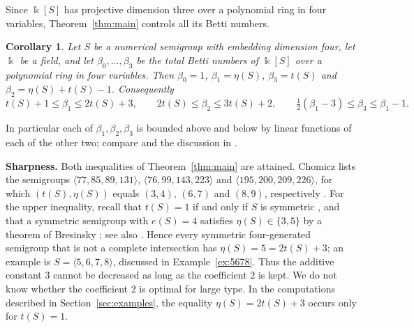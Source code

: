 \documentclass{amsart}
\newtheorem{corollary}[theorem]{Corollary}
\theoremstyle{definition}
\theoremstyle{remark}
\numberwithin{equation}{section}
\newcommand{\kk}{\Bbbk}
\begin{document}
Since $\kk[S]$ has projective dimension three over a polynomial ring in four variables, Theorem~\ref{thm:main} controls all its Betti numbers.

\begin{corollary}\label{cor:betti}
Let $S$ be a numerical semigroup with embedding dimension four, let $\kk$ be a field, and let $\beta_0,\dots,\beta_3$ be the total Betti numbers of $\kk[S]$ over a polynomial ring in four variables. Then $\beta_0=1$, $\beta_1=\eta(S)$, $\beta_3=t(S)$ and $\beta_2=\eta(S)+t(S)-1$. Consequently
\[
t(S)+1\le\beta_1\le 2t(S)+3,\qquad 2t(S)\le\beta_2\le 3t(S)+2,\qquad \tfrac12(\beta_1-3)\le\beta_3\le\beta_1-1 .
\]
\end{corollary}

In particular each of $\beta_1,\beta_2,\beta_3$ is bounded above and below by linear functions of each of the other two; compare \cite[Problem~24]{MS25} and the discussion in \cite[Section~1]{Cho26}.

\medskip\noindent\textbf{Sharpness.} Both inequalities of Theorem~\ref{thm:main} are attained. Chomicz lists the semigroups $\langle 77,85,89,131\rangle$, $\langle 76,99,143,223\rangle$ and $\langle 195,200,209,226\rangle$, for which $(t(S),\eta(S))$ equals $(3,4)$, $(6,7)$ and $(8,9)$, respectively \cite[Section~5]{Cho26}. For the upper inequality, recall that $t(S)=1$ if and only if $S$ is symmetric \cite{Kun70}, and that a symmetric semigroup with $e(S)=4$ satisfies $\eta(S)\in\{3,5\}$ by a theorem of Bresinsky \cite{Bre75b}; see also \cite[Theorem~4.18]{Cho26}. Hence every symmetric four-generated semigroup that is not a complete intersection has $\eta(S)=5=2t(S)+3$; an example is $S=\langle 5,6,7,8\rangle$, discussed in Example~\ref{ex:5678}. Thus the additive constant $3$ cannot be decreased as long as the coefficient $2$ is kept. We do not know whether the coefficient $2$ is optimal for large type. In the computations described in Section~\ref{sec:examples}, the equality $\eta(S)=2t(S)+3$ occurs only for $t(S)=1$.
\end{document}
